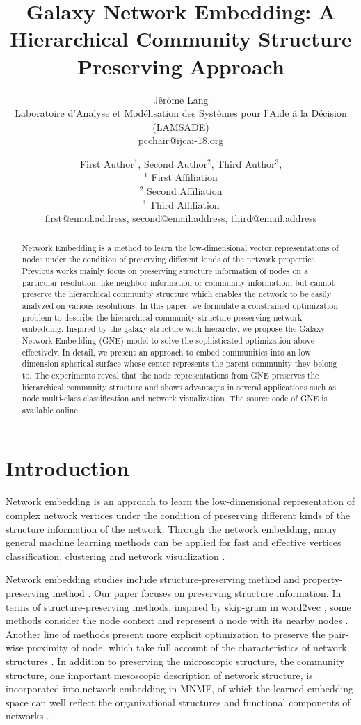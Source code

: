 \documentclass{article}
\title{Galaxy Network Embedding: A Hierarchical Community Structure Preserving Approach}
\author{Jêröme Lang\\ 
Laboratoire d'Analyse et Modélisation des Systèmes pour l'Aide à la Décision (LAMSADE)  \\
pcchair@ijcai-18.org}
\author{
First Author$^1$, 
Second Author$^2$, 
Third Author$^3$, 
\\ 
$^1$ First Affiliation \\
$^2$ Second Affiliation\\
$^3$ Third Affiliation  \\
%
first@email.address,
second@email.address,
third@email.address
}
\theoremstyle{definition}
\begin{document}
\maketitle

\begin{abstract}
	Network Embedding is a method to learn the low-dimensional vector representations of nodes under the condition of preserving different kinds of the network properties. Previous works mainly focus on preserving structure information of nodes on a particular resolution, like neighbor information or community information, but cannot preserve the hierarchical community structure which enables the network to be easily analyzed on various resolutions. In this paper, we formulate a constrained optimization problem to describe the hierarchical community structure preserving network embedding. Inspired by the galaxy structure with hierarchy, we propose the Galaxy Network Embedding (GNE) model to solve the sophisticated optimization above effectively. In detail, we present an approach to embed communities into an low dimension spherical surface whose center represents the parent community they belong to. The experiments reveal that the node representations from GNE preserves the hierarchical community structure and shows advantages in several applications such as node multi-class classification and network visualization. The source code of GNE is available online.

\end{abstract}

\section{Introduction}

		Network embedding is an approach to learn the low-dimensional representation of complex network vertices under the condition of preserving different kinds of the structure information of the network. Through the network embedding, many general machine learning methods can be applied for fast and effective vertices classification, clustering and network visualization \cite{bhagat2011node}\cite{yan2007graph}.
		
		Network embedding studies include structure-preserving method \cite{Grover2016node2vec}\cite{Wang2017Community} and property-preserving method \cite{Yang2015Network}\cite{Hu2017Label}. Our paper focuses on preserving structure information. In terms of structure-preserving methods, inspired by skip-gram in word2vec \cite{mikolov2013efficient}, some methods consider the node context and represent a node with its nearby nodes \cite{Perozzi2014DeepWalk}\cite{Grover2016node2vec}. Another line of methods present more explicit optimization to preserve the pair-wise proximity of node, which take full account of the characteristics of network structures \cite{Tang2015LINE}\cite{Cao2015GraRep}\cite{Wang2016Structural}. In addition to preserving the microscopic structure, the community structure, one important mesoscopic description of network structure, is incorporated into network embedding in MNMF, of which the learned embedding space can well reflect the organizational structures and functional components of networks \cite{Wang2017Community}.
\end{document}
